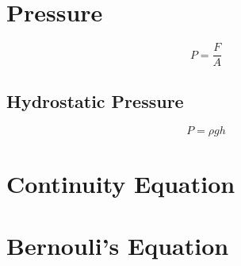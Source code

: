 	
	
	
	\section{Pressure}
	
			\begin{mdframed}[backgroundcolor=orange!20!white]
		\begin{equation}
			P = \frac{F}{A}
			\label{equation:pressure}
		\end{equation}
	\end{mdframed}	

		\subsection{Hydrostatic Pressure}

				\begin{mdframed}[backgroundcolor=orange!20!white]
		\begin{equation}
			P = \rho g h
			\label{equation:hydrostaticpressure}
		\end{equation}
	\end{mdframed}	

\section{Continuity Equation}

\section{Bernouli's Equation}

